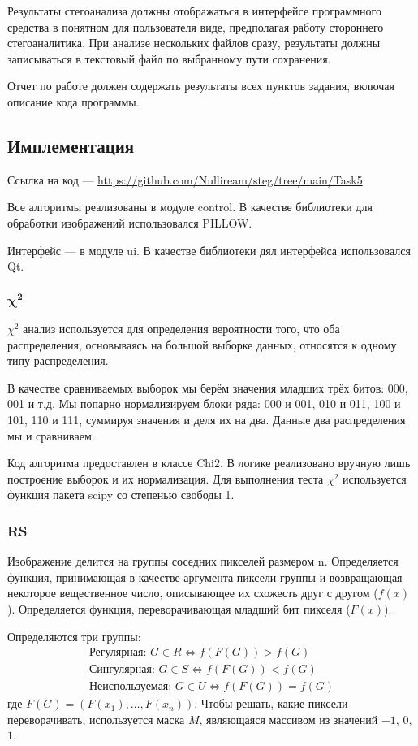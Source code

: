\documentclass[12pt, a4paper, english, russian]{article}
\begin{document}
Результаты стегоанализа должны отображаться в интерфейсе программного средства
в понятном для пользователя виде, предполагая работу стороннего стегоаналитика.
При анализе нескольких файлов сразу, результаты должны записываться в текстовый
файл по выбранному пути сохранения.

Отчет по работе должен содержать результаты всех пунктов задания, включая описание кода программы.

\pagebreak

\subsection{Имплементация}
Ссылка на код --- \url{https://github.com/Nulliream/steg/tree/main/Task5}

Все алгоритмы реализованы в модуле control. В качестве библиотеки для
обработки изображений использовался PILLOW.

Интерфейс --- в модуле ui. В качестве библиотеки дял интерфейса использовался Qt.

\subsubsection{$\mathbf{\chi^2}$}
$\chi^2$ анализ используется для определения вероятности того, что оба распределения,
основываясь на большой выборке данных, относятся к одному типу распределения.

В качестве сравниваемых выборок мы берём значения младших трёх битов: 000, 001 и т.д.
Мы попарно нормализируем блоки ряда: 000 и 001, 010 и 011, 100 и 101, 110 и 111,
суммируя значения и деля их на два. Данные два распределения мы и сравниваем.

Код алгоритма предоставлен в классе Chi2. В логике реализовано вручную
лишь построение выборок и их нормализация. Для выполнения теста $\chi^2$
используется функция пакета scipy со степенью свободы 1.

\subsubsection{RS}
Изображение делится на группы соседних пикселей размером n. Определяется
функция, принимающая в качестве аргумента пиксели группы и возвращающая некоторое
вещественное число, описывающее их схожесть друг с другом ($f(x)$). Определяется функция,
переворачивающая младший бит пикселя ($F(x)$).

Определяются три группы:
\begin{gather*}
	\text{Регулярная: } G \in R \Leftrightarrow f(F(G)) > f(G) \\
	\text{Сингулярная: } G \in S \Leftrightarrow f(F(G)) < f(G) \\
	\text{Неиспользуемая: } G \in U \Leftrightarrow f(F(G)) = f(G)
\end{gather*}
где $F(G) = (F(x_1),\ldots,F(x_n))$. Чтобы решать, какие пиксели переворачивать,
используется маска $M$, являющаяся массивом из значений $-1$, $0$, $1$.
\end{document}
